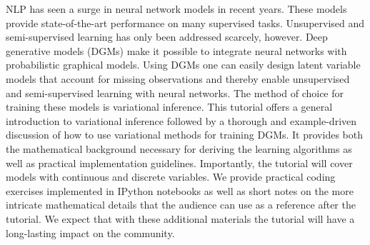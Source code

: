 NLP has seen a surge in neural network models in recent years. These models provide state-of-the-art performance on many supervised tasks. Unsupervised and semi-supervised learning has only been addressed scarcely, however. Deep generative models (DGMs) make it possible to integrate neural networks with probabilistic graphical models. Using DGMs one can easily design latent variable models that account for missing observations and thereby enable unsupervised and semi-supervised learning with neural networks. The method of choice for training these models is variational inference. This tutorial offers a general introduction to variational inference followed by a thorough and example-driven discussion of how to use variational methods for training DGMs. It provides both the mathematical background necessary for deriving the learning algorithms as well as practical implementation guidelines.  Importantly, the tutorial will cover models with continuous and discrete variables. We provide practical coding exercises implemented in IPython notebooks as well as short notes on the more intricate mathematical details that the audience can use as a reference after the tutorial. We expect that with these additional materials the tutorial will have a long-lasting impact on the community.
